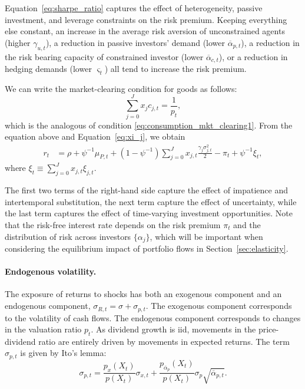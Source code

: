Equation~\eqref{eq:sharpe_ratio} captures the effect of heterogeneity, passive investment, and leverage constraints on the risk premium. Keeping everything else constant, an increase in the average risk aversion of unconstrained agents (higher $\gamma_{u,t}$), a reduction in passive investors' demand (lower $\overline{\alpha}_{p,t}$), a reduction in the risk bearing capacity of constrained investor (lower $\overline{\alpha}_{c,t}$), or a reduction in hedging demands (lower $\varsigma_t$) all tend to increase the risk premium. 

We can write the market-clearing condition for goods as follows:
\begin{equation}
    \sum_{j=0}^J x_j c_{j,t} = \frac{1}{p_t}, 
\end{equation}
which is the analogous of condition \eqref{eq:consumption_mkt_clearing1}. From the equation above and Equation~\eqref{eq:xi_j}, we obtain
\begin{align}\label{eq:interest_rate}
     r_t  &  =  \rho  +\psi^{-1} \mu_{P,t}+ \left (1-\psi^{-1}\right )  \sum_{j=0}^J x_{j,t}\frac{\gamma_j \sigma_{j,t}^2}{2} - \pi_t  +\psi^{-1} \xi_t,
\end{align}
where $\xi_t \equiv \sum_{j=0}^J x_{j,t} \xi_{j,t}$.

The first two terms of the right-hand side capture the effect of impatience and intertemporal substitution, the next term capture the effect of uncertainty, while the last term captures the effect of time-varying investment opportunities. Note that the risk-free interest rate depends on the risk premium $\pi_t$ and the distribution of risk across investors $\{\alpha_j\}$, which will be important when considering the equilibrium impact of portfolio flows in Section~\ref{sec:elasticity}.

\paragraph{Endogenous volatility.} The exposure of returns to shocks has both an exogenous component and an endogenous component, $\sigma_{R,t} = \sigma + \sigma_{p,t}$. 
The exogenous component corresponds to the volatility of cash flows. 
The endogenous component corresponds to changes in the valuation ratio $p_t$. 
As dividend growth is iid, movements in the price-dividend ratio are entirely driven by movements in expected returns. 
The term $\sigma_{p,t}$ is given by Ito's lemma:
\begin{equation}\label{eq:_endogenous_vol}
    \sigma_{p,t} = \frac{p_x(X_t)}{p(X_t)} \sigma_{x,t} + \frac{p_{\overline{\alpha}_p}(X_t)}{p(X_t)} \sigma_{p} \sqrt{\overline{\alpha}_{p,t}}. 
\end{equation}

